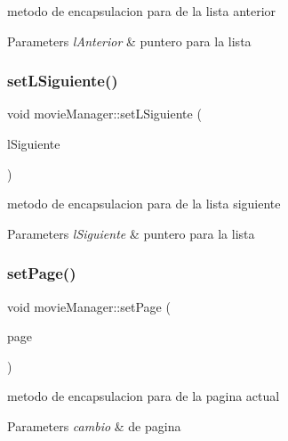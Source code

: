 metodo de encapsulacion para de la lista anterior 


\begin{DoxyParams}{Parameters}
{\em l\+Anterior} & puntero para la lista \\
\hline
\end{DoxyParams}
\mbox{\label{classmovieManager_a4999bd13bacc795fc47d7d8e97bfb0bf}} 
\subsubsection{\texorpdfstring{set\+L\+Siguiente()}{setLSiguiente()}}
{\footnotesize\ttfamily void movie\+Manager\+::set\+L\+Siguiente (\begin{DoxyParamCaption}\item[{\hyperlink{classLinkedList}{Linked\+List}$<$ \hyperlink{classMovie}{Movie} $>$ $\ast$}]{l\+Siguiente }\end{DoxyParamCaption})}



metodo de encapsulacion para de la lista siguiente 


\begin{DoxyParams}{Parameters}
{\em l\+Siguiente} & puntero para la lista \\
\hline
\end{DoxyParams}
\mbox{\label{classmovieManager_aa82aab8426bf729738f8b14321aca9f7}} 
\subsubsection{\texorpdfstring{set\+Page()}{setPage()}}
{\footnotesize\ttfamily void movie\+Manager\+::set\+Page (\begin{DoxyParamCaption}\item[{int}]{page }\end{DoxyParamCaption})}



metodo de encapsulacion para de la pagina actual 


\begin{DoxyParams}{Parameters}
{\em cambio} & de pagina \\
\hline
\end{DoxyParams}
\mbox{\label{classmovieManager_a3de32f2e1d6167109699012d12e7051a}} 
